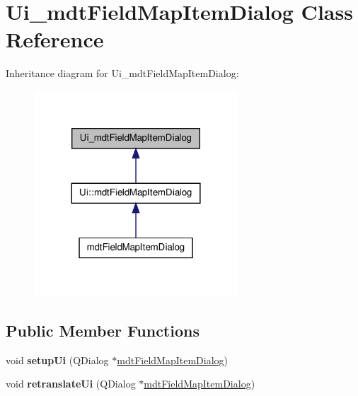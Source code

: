 \hypertarget{class_ui__mdt_field_map_item_dialog}{
\section{Ui\_\-mdtFieldMapItemDialog Class Reference}
\label{class_ui__mdt_field_map_item_dialog}
}


Inheritance diagram for Ui\_\-mdtFieldMapItemDialog:\nopagebreak
\begin{figure}[H]
\begin{center}
\leavevmode
\includegraphics[width=216pt]{class_ui__mdt_field_map_item_dialog__inherit__graph}
\end{center}
\end{figure}
\subsection*{Public Member Functions}
\begin{DoxyCompactItemize}
\item 
\hypertarget{class_ui__mdt_field_map_item_dialog_a4a5a2d0d5245eeb5137a8cbd82b6eb08}{
void {\bfseries setupUi} (QDialog $\ast$\hyperlink{classmdt_field_map_item_dialog}{mdtFieldMapItemDialog})}
\label{class_ui__mdt_field_map_item_dialog_a4a5a2d0d5245eeb5137a8cbd82b6eb08}

\item 
\hypertarget{class_ui__mdt_field_map_item_dialog_a796164b7675186294e0880b78d6a4a3f}{
void {\bfseries retranslateUi} (QDialog $\ast$\hyperlink{classmdt_field_map_item_dialog}{mdtFieldMapItemDialog})}
\label{class_ui__mdt_field_map_item_dialog_a796164b7675186294e0880b78d6a4a3f}

\end{DoxyCompactItemize}
